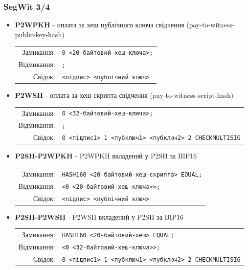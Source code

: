 \documentclass{beamer}
\begin{document}
\begin{frame}
  \frametitle{SegWit 3/4}
  \small
  \begin{itemize}
  \item \textbf{P2WPKH} - оплата за хеш публічного ключа свідчення
    (pay-to-witness-public-key-hash) \break
    \begin{tabular}{rl}
      Замикання: &\tiny\texttt{0 <20-байтовий-хеш-ключа>;} \\
      Відмикання: &\tiny\texttt{;} \\
      Свідок: &\tiny\texttt{<підпис> <публічний ключ>} \\
    \end{tabular}
  \item \textbf{P2WSH} - оплата за хеш скрипта свідчення (pay-to-witness-script-hash)
    \break
    \begin{tabular}{rl}
      Замикання: &\tiny\texttt{0 <32-байтовий-хеш-ключа>;} \\
      Відмикання: &\tiny\texttt{;} \\
      Свідок: &\tiny\texttt{0 <підпис1> 1 <пубключ1> <пубключ2> 2 CHECKMULTISIG} \\
    \end{tabular}
  \item \textbf{P2SH-P2WPKH} - P2WPKH вкладений у P2SH за BIP16
    \break
    \begin{tabular}{rl}
      Замикання: &\tiny\texttt{HASH160 <20-байтовий-хеш-скрипта> EQUAL;} \\
      Відмикання: &\tiny\texttt{<0 <20-байтовий-хеш-ключа>>;} \\
      Свідок: &\tiny\texttt{<підпис> <публічний ключ>} \\
    \end{tabular}
  \item \textbf{P2SH-P2WSH} - P2WSH вкладений у P2SH за BIP16
    \break
    \begin{tabular}{rl}
      Замикання: &\tiny\texttt{HASH160 <20-байтовий-хеш> EQUAL;} \\
      Відмикання: &\tiny\texttt{<0 <32-байтовий-хеш-ключа>>;} \\
      Свідок: &\tiny\texttt{0 <підпис1> 1 <пубключ1> <пубключ2> 2 CHECKMULTISIG} \\
    \end{tabular}
  \end{itemize}
\end{frame}
\end{document}
